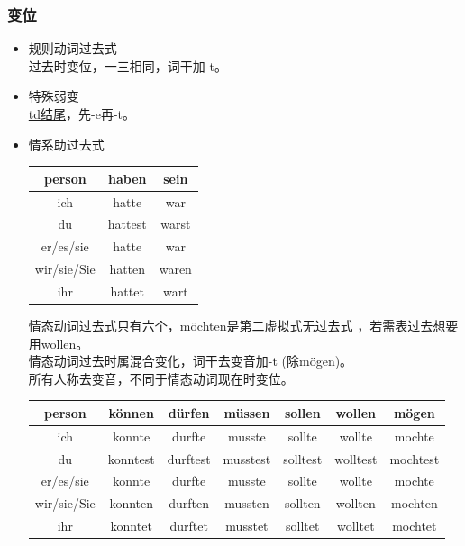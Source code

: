 \subsubsection{变位}
\begin{itemize}
    \item 规则动词过去式 \\
          过去时变位，一三相同，词干加-t。
    \item 特殊弱变 \\
          \hyperref[chap:verb:td]{td结尾}，先-e再-t。
    \item 情系助过去式
          \begin{center}
              \begin{tabular} {|c|c|c|}
                  \hline
                  \rowcolor{gray}
                  person      & haben   & sein  \\
                  \hline
                  ich         & hatte   & war   \\
                  \hline
                  du          & hattest & warst \\
                  \hline
                  er/es/sie   & hatte   & war   \\
                  \hline
                  wir/sie/Sie & hatten  & waren \\
                  \hline
                  ihr         & hattet  & wart  \\
                  \hline
              \end{tabular}
          \end{center}
          情态动词过去式只有六个，möchten是第二虚拟式无过去式 ，若需表过去想要用wollen。 \\
          情态动词过去时属混合变化，词干去变音加-t (除mögen)。 \\
          所有人称去变音，不同于情态动词现在时变位。\\
          \begin{center}
              \begin{tabular} {|c|c|c|c|c|c|c|}
                  \hline
                  \rowcolor{gray}
                  person      & können   & dürfen   & müssen   & sollen   & wollen   & mögen    \\
                  \hline
                  ich         & konnte   & durfte   & musste   & sollte   & wollte   & mochte   \\
                  \hline
                  du          & konntest & durftest & musstest & solltest & wolltest & mochtest \\
                  \hline
                  er/es/sie   & konnte   & durfte   & musste   & sollte   & wollte   & mochte   \\
                  \hline
                  wir/sie/Sie & konnten  & durften  & mussten  & sollten  & wollten  & mochten  \\
                  \hline
                  ihr         & konntet  & durftet  & musstet  & solltet  & wolltet  & mochtet  \\
                  \hline
              \end{tabular}
          \end{center}
\end{itemize}



